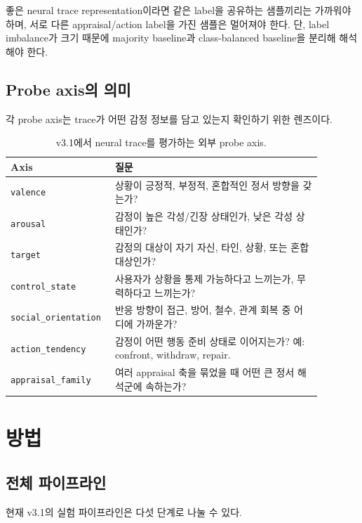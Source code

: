 \documentclass[11pt,a4paper]{article}
\begin{document}
좋은 neural trace representation이라면 같은 label을 공유하는 샘플끼리는 가까워야 하며, 서로 다른 appraisal/action label을 가진 샘플은 멀어져야 한다. 단, label imbalance가 크기 때문에 majority baseline과 class-balanced baseline을 분리해 해석해야 한다.

\subsection{Probe axis의 의미}

각 probe axis는 trace가 어떤 감정 정보를 담고 있는지 확인하기 위한 렌즈이다.

\begin{table}[h]
\centering
\small
\begin{tabular}{p{0.25\linewidth}p{0.63\linewidth}}
\toprule
Axis & 질문 \\
\midrule
\texttt{valence} & 상황이 긍정적, 부정적, 혼합적인 정서 방향을 갖는가? \\
\texttt{arousal} & 감정이 높은 각성/긴장 상태인가, 낮은 각성 상태인가? \\
\texttt{target} & 감정의 대상이 자기 자신, 타인, 상황, 또는 혼합 대상인가? \\
\texttt{control\_state} & 사용자가 상황을 통제 가능하다고 느끼는가, 무력하다고 느끼는가? \\
\texttt{social\_orientation} & 반응 방향이 접근, 방어, 철수, 관계 회복 중 어디에 가까운가? \\
\texttt{action\_tendency} & 감정이 어떤 행동 준비 상태로 이어지는가? 예: confront, withdraw, repair. \\
\texttt{appraisal\_family} & 여러 appraisal 축을 묶었을 때 어떤 큰 정서 해석군에 속하는가? \\
\bottomrule
\end{tabular}
\caption{v3.1에서 neural trace를 평가하는 외부 probe axis.}
\end{table}

\section{방법}

\subsection{전체 파이프라인}

현재 v3.1의 실험 파이프라인은 다섯 단계로 나눌 수 있다.
\end{document}
